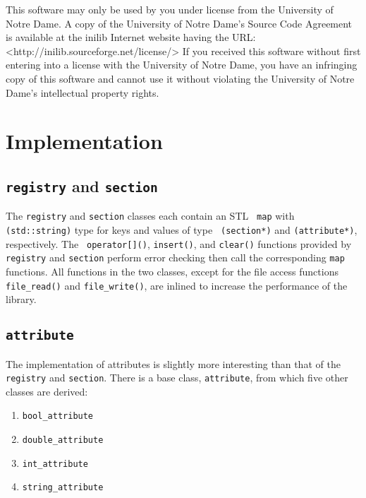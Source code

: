 %
This software may only be used by you under license from the
University of Notre Dame.  A copy of the University of Notre Dame's
Source Code Agreement is available at the inilib Internet website
having the URL: <http://inilib.sourceforge.net/license/> If you
received this software without first entering into a license with the
University of Notre Dame, you have an infringing copy of this software
and cannot use it without violating the University of Notre Dame's
intellectual property rights.
% 
%

\section{Implementation}

\subsection[registry and section]{{\tt registry} and {\tt section}}

The {\tt registry} and {\tt section} classes each contain an STL {\tt
  map} with {\tt (std::string)} type for keys and values of type {\tt
  (section*)} and {\tt (attribute*)}, respectively.  The {\tt
  operator[]()}, {\tt insert()}, and {\tt clear()} functions provided
by {\tt registry} and {\tt section} perform error checking then call
the corresponding {\tt map} functions.  All functions in the two
classes, except for the file access functions {\tt file\_\-read()} and
{\tt file\_\-write()}, are inlined to increase the performance of the
library.

\subsection[attribute]{\tt attribute}
\label{sec:implementation:attribute}

The implementation of attributes is slightly more interesting than
that of the {\tt registry} and {\tt section}.  There is a base class,
{\tt attribute}, from which five other classes are derived:

\begin{enumerate}
\item {\tt bool\_\-attribute}
\item {\tt double\_\-attribute}
\item {\tt int\_\-attribute}
\item {\tt string\_\-attribute}
\end{enumerate}

